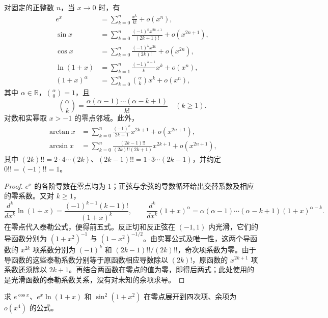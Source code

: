 \begin{proposition}[常用麦克劳林公式]
\label{prop:standard-maclaurin-formulas}
对固定的正整数 $n$，当 $x\to0$ 时，有
\begin{align}
    e^x&=\sum_{k=0}^n\frac{x^k}{k!}+o(x^n),
        \label{eq:maclaurin-exponential}\\
    \sin x&=\sum_{k=0}^n\frac{(-1)^kx^{2k+1}}{(2k+1)!}
              +o(x^{2n+1}),
        \label{eq:maclaurin-sine}\\
    \cos x&=\sum_{k=0}^n\frac{(-1)^kx^{2k}}{(2k)!}
              +o(x^{2n}),
        \label{eq:maclaurin-cosine}\\
    \ln(1+x)&=\sum_{k=1}^n\frac{(-1)^{k-1}}k x^k+o(x^n),
        \label{eq:maclaurin-logarithm}\\
    (1+x)^\alpha&=\sum_{k=0}^n\binom\alpha k x^k+o(x^n),
        \label{eq:maclaurin-real-power}
\end{align}
其中 $\alpha\in\mathbb{R}$，$\binom\alpha0=1$，且
\[
    \binom\alpha k=\frac{\alpha(\alpha-1)\cdots(\alpha-k+1)}{k!}
    \quad(k\geq1).
\]
对数和实幂取 $x>-1$ 的零点邻域。此外，
\begin{align}
    \arctan x&=\sum_{k=0}^n\frac{(-1)^k}{2k+1}x^{2k+1}
                  +o(x^{2n+1}),
        \label{eq:maclaurin-arctangent}\\
    \arcsin x&=\sum_{k=0}^n
        \frac{(2k-1)!!}{(2k)!!(2k+1)}x^{2k+1}
                  +o(x^{2n+1}),
        \label{eq:maclaurin-arcsine}
\end{align}
其中 $(2k)!!=2\cdot4\cdots(2k)$、$(2k-1)!!=1\cdot3\cdots(2k-1)$，并约定 $0!!=(-1)!!=1$。
\end{proposition}

\begin{proof}
$e^x$ 的各阶导数在零点均为 $1$；正弦与余弦的导数循环给出交替系数及相应的零系数。又对 $k\geq1$，
\[
    \frac{d^k}{dx^k}\ln(1+x)
    =\frac{(-1)^{k-1}(k-1)!}{(1+x)^k},\qquad
    \frac{d^k}{dx^k}(1+x)^\alpha
    =\alpha(\alpha-1)\cdots(\alpha-k+1)(1+x)^{\alpha-k}.
\]
在零点代入泰勒公式，便得前五式。反正切和反正弦在 $(-1,1)$ 内光滑，它们的导函数分别为 $(1+x^2)^{-1}$ 与 $(1-x^2)^{-1/2}$。由实幂公式及唯一性，这两个导函数的 $x^{2k}$ 项系数分别为 $(-1)^k$ 和 $(2k-1)!!/(2k)!!$，奇次项系数为零。由于导函数的这些泰勒系数分别等于原函数相应导数除以 $(2k)!$，原函数的 $x^{2k+1}$ 项系数还须除以 $2k+1$。再结合两函数在零点的值为零，即得后两式；此处使用的是光滑函数的泰勒系数关系，没有对未知的余项求导。
\end{proof}

\begin{example}
\label{ex:taylor-composition-and-product}
求 $e^{\cos x}$、$e^x\ln(1+x)$ 和 $\sin^2(1+x^2)$ 在零点展开到四次项、余项为 $o(x^4)$ 的公式。
\end{example}

